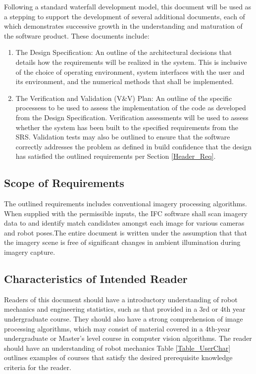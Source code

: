 \documentclass[12pt]{article}
\begin{document}
Following a standard waterfall development model, this document will be used as a 
stepping to support the development of several additional documents, each of which 
demonstrates successive growth in the understanding and maturation of the software 
product. These documents include:
\begin{enumerate}
  \item The Design Specification: An outline of the architectural decisions that 
  details   how the requirements will be realized in the system. This is inclusive 
  of the choice of operating environment, system interfaces with the user and its 
  environment, and the   numerical methods that shall be implemented.

  \item The Verification and Validation (V\&V) Plan: An outline of the specific processess 
  to be used to assess the implementation of the code as developed from the Design 
  Specification. Verification assessments will be used to assess whether the system has been 
  built to the specified requirements from the SRS. Validation tests may also be outlined to 
  ensure that the software correctly addresses the problem as defined in  build confidence 
  that the   design has satisfied the outlined requirements per Section \ref{Header_Req}.
\end{enumerate}


\subsection{Scope of Requirements} 
The outlined requirements includes conventional imagery processing algorithms. When supplied 
with the permissible inputs, the IFC software shall scan imagery data to and 
identify match candidates amongst each image for various cameras and robot poses.The entire 
document is written under the assumption that that the imagery scene 
is free of significant changes in ambient illumination during imagery capture.

\subsection{Characteristics of Intended Reader} \label{sec_IntendedReader}
Readers of this document should have a introductory understanding of robot mechanics and 
engineering statistics, such as that provided in a 3rd or 4th year undergraduate course. They 
should also have a strong comprehension of image processing algorithms, which may consist of 
material covered in a 4th-year undergraduate or Master's level course in computer vision 
algorithms. The reader should have an understanding of robot mechanics 
Table \ref{Table_UserChar} outlines examples of courses that satisfy 
the desired prerequisite knowledge criteria for the reader. 
\end{document}
